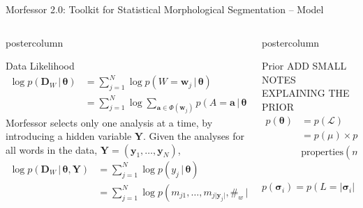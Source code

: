 \documentclass[final]{beamer} %
\newcommand{\mat}[1]{\mathbf{#1}}
\newcommand{\seq}[1]{\boldsymbol{#1}}
\newcommand{\txt}[1]{\textrm{#1}}
\newcommand{\len}[1]{\lvert#1\rvert}
\newcommand{\params}{\boldsymbol{\theta}}
\newcommand{\data}{\seq{D}}
\newcommand{\lexicon}{\mathcal{L}}
\newcommand{\tokenset}{\Phi}
\newcommand{\bound}{\#}
\newcommand{\vb}{\,|\,}
\newcommand{\Y}{\mat{Y}}
\begin{document}
\begin{frame}{Morfessor 2.0: Toolkit for Statistical Morphological Segmentation -- Model}
\begin{columns}
\begin{column}{.4\textwidth}
      \begin{beamercolorbox}[center,wd=\textwidth]{postercolumn}
 \begin{block}{Data Likelihood}
\begin{align*}
  \log p(\data_W \vb \params)
  & = \sum_{j=1}^{N} \log p(W=\seq{w}_j \vb \params) \nonumber \\
  & = \sum_{j=1}^{N} \log \sum_{\seq{a} \in \tokenset(\seq{w}_j)}
  p(A=\seq{a} \vb \params),
\end{align*}
 Morfessor selects only one analysis at a time, by introducing a hidden variable $\Y$. Given the analyses for
all words in the data, $\Y = (\seq{y}_1, \ldots, \seq{y}_N)$,
\begin{align*}
  \log p(\data_W \vb \params, \Y)
  & = \sum_{j=1}^{N} \log 
  p(y_j \vb \params) 
  \\&= \sum_{j=1}^{N} \log 
  p(m_{j1}, \ldots, m_{j\len{\seq{y}_j}}, \bound_w \vb \params) 
\label{eq:morphylikelihood}
\end{align*}

            \end{block}
	\end{beamercolorbox}





\end{column}

\begin{column}{.3\textwidth}

      \begin{beamercolorbox}[center,wd=\textwidth]{postercolumn}
 \begin{block}{Prior}
ADD SMALL NOTES EXPLAINING THE PRIOR
\begin{align*}
p(\params) & = p(\lexicon)\\ &= p(\mu) \times p(\txt{properties}(m_1), \ldots, \\&\txt{properties}(m_{\mu})) \times \mu!.
\end{align*}

\begin{equation*}
  p(\seq{\sigma}_i) = p(L=\len{\seq{\sigma}_i})
  \prod_{j=1}^{\len{\seq{\sigma}_i}} p(C=\seq{\sigma}_{ij})
\end{equation*}

            \end{block}
	\end{beamercolorbox}

\vfill


\end{column}
\end{columns}
\end{frame}
\end{document}
